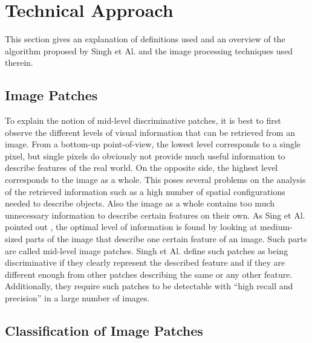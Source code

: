
\section{Technical Approach}\label{sec:StateArt}

This section gives an explanation of definitions used and an overview of the algorithm proposed by Singh et Al. \cite{Singh2012DiscPat} and the image processing techniques used therein.

\subsection{Image Patches}

To explain the notion of mid-level discriminative patches, it is best to first observe the different levels of visual information that can be retrieved from an image. From a bottom-up point-of-view, the lowest level corresponds to a single pixel, but single pixels do obviously not provide much useful information to describe features of the real world. On the opposite side, the highest level corresponds to the image as a whole. This poses several problems on the analysis of the retrieved information such as a high number of spatial configurations needed to describe objects. Also the image as a whole contains too much unnecessary information to describe certain features on their own. As Sing et Al. pointed out \cite{Singh2012DiscPat}, the optimal level of information is found by looking at medium-sized parts of the image that describe one certain feature of an image. Such parts are called mid-level image patches. Singh et Al. \cite{Singh2012DiscPat} define such patches as being discriminative if they clearly represent the described feature and if they are different enough from other patches describing the same or any other feature. Additionally, they require such patches to be detectable with "`high recall and precision"' in a large number of images.

\subsection{Classification of Image Patches}


